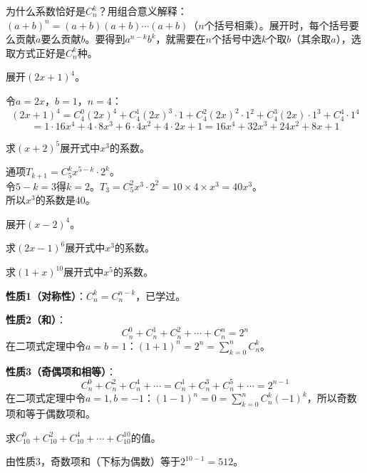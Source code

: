 为什么系数恰好是$C_n^k$？用组合意义解释：$(a+b)^n = (a+b)(a+b)\cdots(a+b)$（$n$个括号相乘）。展开时，每个括号要么贡献$a$要么贡献$b$。要得到$a^{n-k}b^k$，就需要在$n$个括号中选$k$个取$b$（其余取$a$），选取方式正好是$C_n^k$种。

\begin{example}
展开$(2x+1)^4$。
\end{example}
\begin{solution}
令$a=2x$，$b=1$，$n=4$：
\[
(2x+1)^4 = C_4^0(2x)^4 + C_4^1(2x)^3\cdot1 + C_4^2(2x)^2\cdot1^2 + C_4^3(2x)\cdot1^3 + C_4^4\cdot1^4
\]
\[
= 1\cdot16x^4 + 4\cdot8x^3 + 6\cdot4x^2 + 4\cdot2x + 1 = 16x^4 + 32x^3 + 24x^2 + 8x + 1
\]
\end{solution}

\begin{example}
求$(x+2)^5$展开式中$x^3$的系数。
\end{example}
\begin{solution}
通项$T_{k+1} = C_5^k x^{5-k} \cdot 2^k$。\\
令$5-k=3$得$k=2$。$T_3 = C_5^2 x^3 \cdot 2^2 = 10 \times 4 \times x^3 = 40x^3$。\\
所以$x^3$的系数是$40$。
\end{solution}

\begin{exercise}
\item 展开$(x-2)^4$。
\item 求$(2x-1)^6$展开式中$x^3$的系数。
\item 求$(1+x)^{10}$展开式中$x^5$的系数。
\end{exercise}


\textbf{性质1（对称性）}：$C_n^k = C_n^{n-k}$，已学过。

\textbf{性质2（和）}：
\[
C_n^0 + C_n^1 + C_n^2 + \cdots + C_n^n = 2^n
\]
在二项式定理中令$a=b=1$：$(1+1)^n = 2^n = \sum_{k=0}^n C_n^k$。

\textbf{性质3（奇偶项和相等）}：
\[
C_n^0 + C_n^2 + C_n^4 + \cdots = C_n^1 + C_n^3 + C_n^5 + \cdots = 2^{n-1}
\]
在二项式定理中令$a=1,b=-1$：$(1-1)^n = 0 = \sum_{k=0}^n C_n^k (-1)^k$，所以奇数项和等于偶数项和。

\begin{example}
求$C_{10}^0 + C_{10}^2 + C_{10}^4 + \cdots + C_{10}^{10}$的值。
\end{example}
\begin{solution}
由性质$3$，奇数项和（下标为偶数）等于$2^{10-1} = 512$。
\end{solution}

